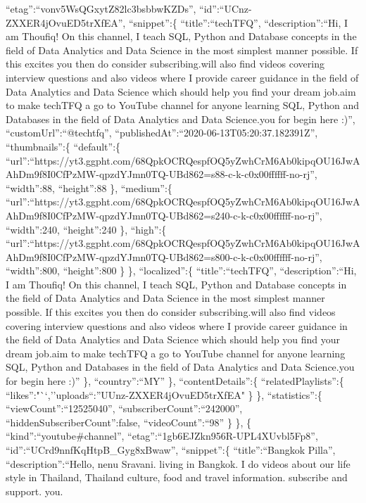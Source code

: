 \documentclass[11pt]{article}
\begin{document}
``etag'':``vonv5WsQGxytZ82lc3bsbbwKZDs'',
``id'':``UCnz-ZXXER4jOvuED5trXfEA'', ``snippet'':\{
``title'':``techTFQ'', ``description'':``Hi, I am Thoufiq! On this
channel, I teach SQL, Python and Database concepts in the field of Data
Analytics and Data Science in the most simplest manner possible. If this
excites you then do consider subscribing.\n\nYou will also find videos
covering interview questions and also videos where I provide career
guidance in the field of Data Analytics and Data Science which should
help you find your dream job.\n\nI aim to make techTFQ a go to YouTube
channel for anyone learning SQL, Python and Databases in the field of
Data Analytics and Data Science.\n\nThank you for begin here :)\n'',
``customUrl'':``@techtfq'',
``publishedAt'':``2020-06-13T05:20:37.182391Z'', ``thumbnails'':\{
``default'':\{
``url'':``https://yt3.ggpht.com/68QpkOCRQespfOQ5yZwhCrM6Ab0kipqOU16JwAAhDm9f8I0CfPzMW-qpzdYJmn0TQ-UBd862=s88-c-k-c0x00ffffff-no-rj'',
``width'':88, ``height'':88 \}, ``medium'':\{
``url'':``https://yt3.ggpht.com/68QpkOCRQespfOQ5yZwhCrM6Ab0kipqOU16JwAAhDm9f8I0CfPzMW-qpzdYJmn0TQ-UBd862=s240-c-k-c0x00ffffff-no-rj'',
``width'':240, ``height'':240 \}, ``high'':\{
``url'':``https://yt3.ggpht.com/68QpkOCRQespfOQ5yZwhCrM6Ab0kipqOU16JwAAhDm9f8I0CfPzMW-qpzdYJmn0TQ-UBd862=s800-c-k-c0x00ffffff-no-rj'',
``width'':800, ``height'':800 \} \}, ``localized'':\{
``title'':``techTFQ'', ``description'':``Hi, I am Thoufiq! On this
channel, I teach SQL, Python and Database concepts in the field of Data
Analytics and Data Science in the most simplest manner possible. If this
excites you then do consider subscribing.\n\nYou will also find videos
covering interview questions and also videos where I provide career
guidance in the field of Data Analytics and Data Science which should
help you find your dream job.\n\nI aim to make techTFQ a go to YouTube
channel for anyone learning SQL, Python and Databases in the field of
Data Analytics and Data Science.\n\nThank you for begin here :)\n'' \},
``country'':``MY'' \}, ``contentDetails'':\{ ``relatedPlaylists'':\{
``likes'':"``,''uploads``:''UUnz-ZXXER4jOvuED5trXfEA" \} \},
``statistics'':\{ ``viewCount'':``12525040'',
``subscriberCount'':``242000'', ``hiddenSubscriberCount'':false,
``videoCount'':``98'' \} \}, \{ ``kind'':``youtube\#channel'',
``etag'':``1gb6EJZkn956R-UPL4XUvbl5Fp8'',
``id'':``UCrd9nnfKqHtpB\_Gyg8xBwaw'', ``snippet'':\{ ``title'':``Bangkok
Pilla'', ``description'':``Hello, nenu Sravani. living in Bangkok. I do
videos about our life style in Thailand, Thailand culture, food and
travel information. \nPlease subscribe and support. \nthank you.
\end{document}

